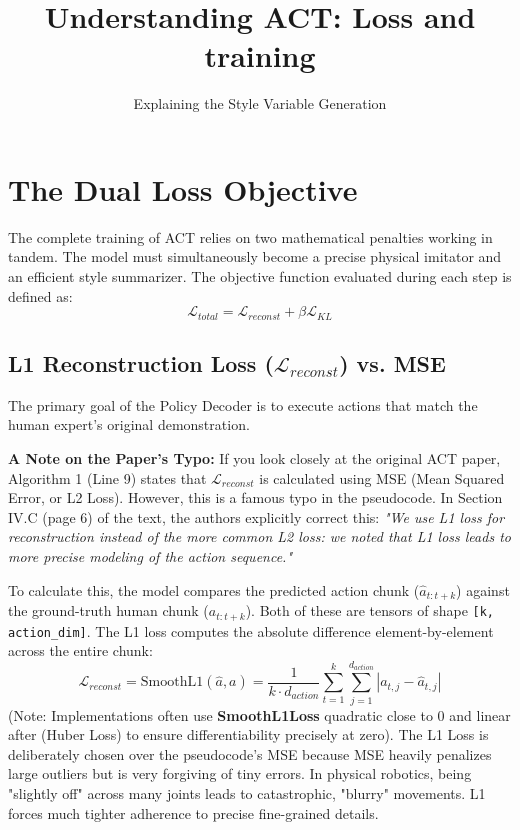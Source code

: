 \documentclass[11pt,a4paper]{article}
\title{\textbf{Understanding ACT: Loss and training}}
\author{Explaining the Style Variable Generation}
\date{\vspace{-5ex}}
\begin{document}
\maketitle

\section{The Dual Loss Objective}
The complete training of ACT relies on two mathematical penalties working in tandem. The model must simultaneously become a precise physical imitator and an efficient style summarizer. The objective function evaluated during each step is defined as:
\[ \mathcal{L}_{total} = \mathcal{L}_{reconst} + \beta \mathcal{L}_{KL} \]

\subsection{L1 Reconstruction Loss ($\mathcal{L}_{reconst}$) vs. MSE}
The primary goal of the Policy Decoder is to execute actions that match the human expert's original demonstration. 

\textbf{A Note on the Paper's Typo:} If you look closely at the original ACT paper, Algorithm 1 (Line 9) states that $\mathcal{L}_{reconst}$ is calculated using MSE (Mean Squared Error, or L2 Loss). However, this is a famous typo in the pseudocode. In Section IV.C (page 6) of the text, the authors explicitly correct this: \textit{"We use L1 loss for reconstruction instead of the more common L2 loss: we noted that L1 loss leads to more precise modeling of the action sequence."}

To calculate this, the model compares the predicted action chunk ($\hat{a}_{t:t+k}$) against the ground-truth human chunk ($a_{t:t+k}$). Both of these are tensors of shape \texttt{[k, action\_dim]}. The L1 loss computes the absolute difference element-by-element across the entire chunk:
\[ \mathcal{L}_{reconst} = \text{SmoothL1}(\hat{a}, a) = \frac{1}{k \cdot d_{action}} \sum_{t=1}^{k} \sum_{j=1}^{d_{action}} \left| a_{t,j} - \hat{a}_{t,j} \right| \]
(Note: Implementations often use \textbf{SmoothL1Loss} quadratic close to 0 and linear after (Huber Loss) to ensure differentiability precisely at zero). The L1 Loss is deliberately chosen over the pseudocode's MSE because MSE heavily penalizes large outliers but is very forgiving of tiny errors. In physical robotics, being "slightly off" across many joints leads to catastrophic, "blurry" movements. L1 forces much tighter adherence to precise fine-grained details.
\end{document}
